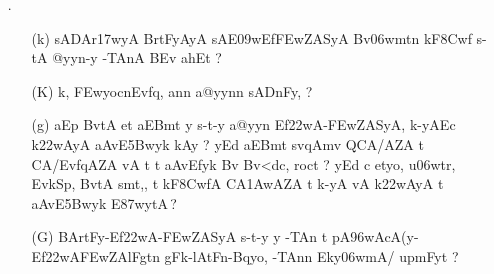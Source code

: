 \begin{itemize}
   {\dn .. aA .. s\2-tEf\322wAyA, nvFnA pArE-\3FEwkF c p\388wEt, ..}


\item[{\dn \dnnum \rn{10} }.] \begin{itemize}

            \item[({\dn k})] {\dn sA\2DAr\317wyA\2 BrtFyAyA\2 sAE\309wEf\3FEwZASyA\2 Bv\306wmt\?n kF\38Cwf\2 s\2-tA\- @yyn-y -TAnA\2  BEv ah\0Et {\rs ?\re}}
            
            \item[({\dn K})] {\dn k, \3FEwyocnEvf\?q, an\?n a@yyn\?n sADnFy, {\rs ?\re}}
            
            \item[({\dn g})] {\dn aEp BvtA et aEBmt y s\2-t-y a@yyn\2 Ef\322wA{\rs -\re}\3FEwZASyA, k-yA\2Ec k\322wAyA aAvE\35Bwyk\2 kAy\0 {\rs ?\re} yEd aEBmt {\dn \dnnum {\rs (\re}} sv\4qAm\?v QCA/AZA\2 t\?{\rs ,\re} {\dn \dnnum{\rs (\re}}  CA/Evf\?qAZA\2 vA t\?{\rs ,\re} t aAvEfyk\2 Bv Bv<dc, roc\?t {\rs ?\re} yEd c etyo, u\306wtr, EvkSp, BvtA\2 s\2mt,{\rs ,\re} t kF\38CwfA\2 CA\31AwAZA t\?{\rs ,\re} k-yA\2 vA k\322wAyA\2{\rs ,\re} t aAvE\35Bwyk\2 E\387wytA\,{\rs ?\re}} 
            
            \item[({\dn G})] {\dn BArtFy{\rs -\re}Ef\322wA{\rs -\re}\3FEwZASyA\2 s\2-t-y y -TAn t pA\396wAcA(y{\rs -\re}Ef\322wA\-\3FEwZAlFgt\?n g\5Fk{\rs -\re}lAtFn{\rs -\re}Bqyo, -TAn\?n Eky\306wmA/ upmFy\?t {\rs ?\re}} 
                               
            \end{itemize} 
\end{itemize} 
           
